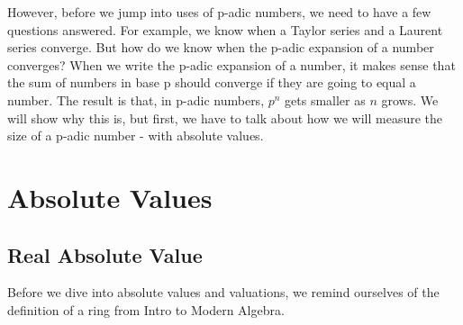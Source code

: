 \documentclass[a4paper]{article}
\begin{document}
However, before we jump into uses of p-adic numbers, we need to have a few
questions answered.  For example, we know when a Taylor 
series and a Laurent series converge.  But how do we know when the p-adic 
expansion of a number converges? When we write the p-adic expansion of a
number, it makes sense that the sum of numbers in base p should converge if
they are going to equal a number.  The result is that, in p-adic
numbers, $p^n$ gets smaller as $n$ grows.  We will show why this is, but
first, we have to talk about how we will measure the size of a p-adic
number - with absolute values.

\section{Absolute Values}

\subsection{Real Absolute Value}
Before we dive into absolute values and valuations, we remind 
ourselves of the definition of a ring from Intro to Modern Algebra.
\end{document}
